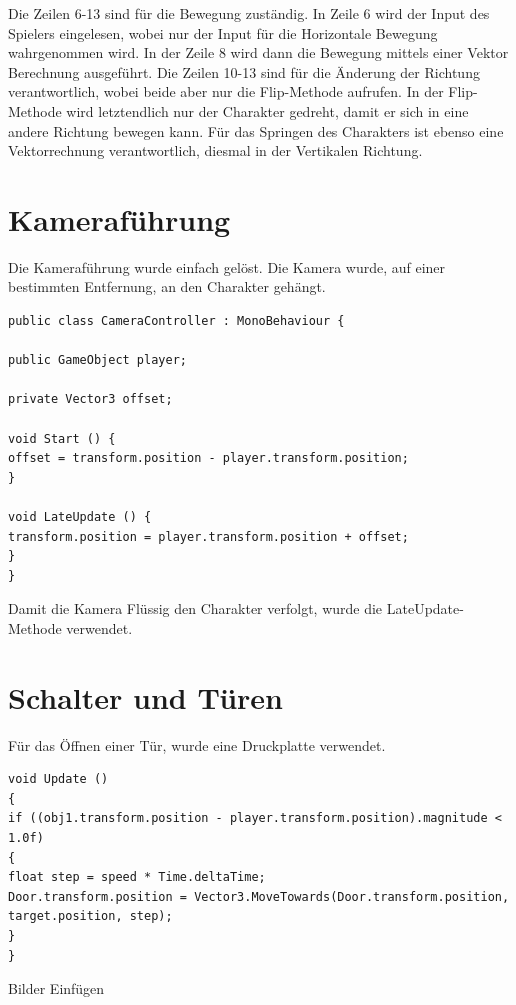 Die Zeilen 6-13  sind für die Bewegung zuständig. In Zeile 6 wird der Input des Spielers eingelesen, wobei nur der Input für die Horizontale Bewegung wahrgenommen wird.
In der Zeile 8 wird dann die Bewegung mittels einer Vektor Berechnung ausgeführt.
Die Zeilen 10-13 sind für die Änderung der Richtung verantwortlich, wobei beide aber nur die Flip-Methode aufrufen. In der Flip-Methode wird letztendlich nur der Charakter gedreht, damit er sich in eine andere Richtung bewegen kann.
Für das Springen des Charakters ist ebenso eine Vektorrechnung verantwortlich, diesmal in der Vertikalen Richtung.

\section{Kameraführung}
Die Kameraführung wurde einfach gelöst. Die Kamera wurde, auf einer bestimmten Entfernung, an den Charakter gehängt. 

\begin{lstlisting}[language={[Sharp]C}]
public class CameraController : MonoBehaviour {

public GameObject player;

private Vector3 offset;

void Start () {
offset = transform.position - player.transform.position;
}

void LateUpdate () {
transform.position = player.transform.position + offset;
}
}
\end{lstlisting}
Damit die Kamera Flüssig den Charakter verfolgt, wurde die LateUpdate-Methode verwendet.

\section{Schalter und Türen}
Für das Öffnen einer Tür, wurde eine Druckplatte verwendet. 
\begin{lstlisting}[language={[Sharp]C}]
void Update ()
{
if ((obj1.transform.position - player.transform.position).magnitude < 1.0f)
{
float step = speed * Time.deltaTime;
Door.transform.position = Vector3.MoveTowards(Door.transform.position, target.position, step);
}
}
\end{lstlisting}

Bilder Einfügen


